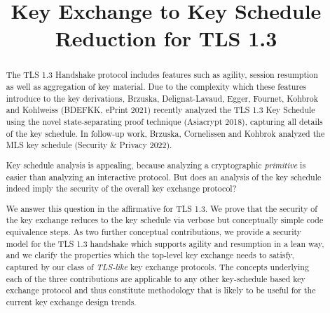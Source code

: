 \documentclass[hyperref,envcountsame,envcountsect,runningheads]{llncs}%
\title{Key Exchange to Key Schedule\\Reduction for TLS 1.3}
\author{}\institute{}
\begin{document}
\maketitle
\vspace{-1.3cm}

\newcommand\pink{\textcolor{kxpink}{pink}}
\newcommand\blue{\textcolor{kxblue}{blue}}
\newcommand\gray{\textcolor{gray}{gray}}

\begin{abstract}
The TLS 1.3 Handshake protocol includes features
such as agility, session resumption as well as aggregation of
key material. Due to the complexity which these features introduce
to the key derivations, Brzuska, Delignat-Lavaud, Egger, Fournet, Kohbrok
and Kohlweiss (BDEFKK, ePrint 2021) recently analyzed the TLS 1.3 Key Schedule
using the novel state-separating proof technique (Asiacrypt 2018), capturing
all details of the key schedule. In follow-up work, Brzuska, Cornelissen
and Kohbrok analyzed the MLS key schedule (Security \& Privacy 2022).

Key schedule analysis is appealing, because analyzing a cryptographic
\emph{primitive} is easier than analyzing an interactive protocol. But
does an analysis of the key schedule indeed imply the security of the
overall key exchange protocol?

We answer this question in the affirmative for TLS 1.3. We prove that the 
security of the key exchange reduces to the key schedule via verbose but 
conceptually simple code equivalence steps. As two further conceptual
contributions, we provide a security model for the TLS 1.3 handshake
which supports agility and resumption in a lean way, and we clarify the
properties which the top-level key exchange needs to satisfy, captured
by our class of \emph{TLS-like} key exchange protocols. The concepts
underlying each of the three contributions are applicable to any other
key-schedule based key exchange protocol and thus constitute methodology
that is likely to be useful for the current key exchange design trends.
%
%
\end{abstract}
\end{document}
